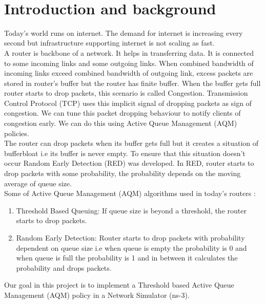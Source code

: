 \begin{center}
{\huge\textbf{\ttitle}}\\
\end{center}
\section{Introduction and background}
Today's world runs on internet. The demand for internet is increasing every second but infrastructure supporting internet is not scaling as fast. \\
A router is backbone of a network. It helps in transferring data. It is connected to some incoming links and some outgoing links. When combined bandwidth of incoming links exceed combined bandwidth of outgoing link, excess packets are stored in router's buffer but the router has finite buffer. When the buffer gets full router starts to drop packets, this scenario is called Congestion. Transmission Control Protocol (TCP) uses this implicit signal of dropping packets as sign of congestion. We can tune this packet dropping behaviour to notify clients of congestion early. We can do this using Active Queue Management (AQM) policies.\\ 
The router can drop packets when its buffer gets full but it creates a situation of bufferbloat i.e its buffer is never empty. To ensure that this situation doesn't occur Random Early Detection (RED) was developed. In RED, router starts to drop packets with some probability, the probability depends on the moving average of queue size. \\
Some of Active Queue Management (AQM) algorithms used in today's routers :
\begin{enumerate}
    \item Threshold Based Queuing: If queue size is beyond a threshold, the router starts to drop packets. %
    \item Random Early Detection: Router starts to drop packets with probability dependent on queue size i.e when queue is empty the probability is 0 and when queue is full the probability is 1 and in between it calculates the probability and drops packets.  %
\end{enumerate}
Our goal in this project is to implement a Threshold based Active Queue Management (AQM) policy in a Network Simulator (ns-3).

\clearpage

